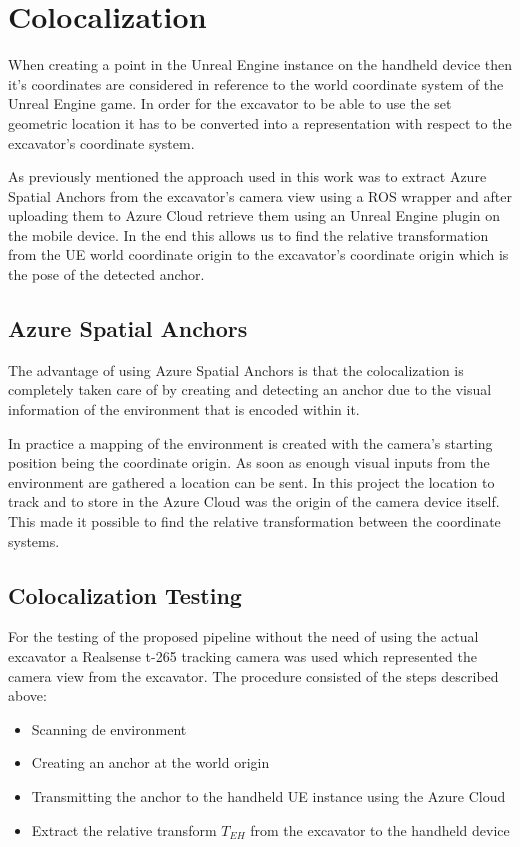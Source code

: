 \chapter*{Colocalization}\label{ch:colocalization}

When creating a point in the Unreal Engine instance on the handheld device then it's coordinates are considered in reference to the world coordinate system of the Unreal Engine game. In order for the excavator to be able to use the set geometric location it has to be converted into a representation with respect to the excavator's coordinate system.

As previously mentioned the approach used in this work was to extract Azure Spatial Anchors from the excavator's camera view using a ROS wrapper and after uploading them to Azure Cloud retrieve them using an Unreal Engine plugin on the mobile device. In the end this allows us to find the relative transformation from the UE world coordinate origin to the excavator's coordinate origin which is the pose of the detected anchor.

\section*{Azure Spatial Anchors}\label{sec:azure_spatial_anchors}

The advantage of using Azure Spatial Anchors is that the colocalization is completely taken care of by creating and detecting an anchor due to the visual information of the environment that is encoded within it.

In practice a mapping of the environment is created with the camera's starting position being the coordinate origin. As soon as enough visual inputs from the environment are gathered a location can be sent. In this project the location to track and to store in the Azure Cloud was the origin of the camera device itself. This made it possible to find the relative transformation between the coordinate systems.

\section*{Colocalization Testing}\label{sec:colocalization_testing}

For the testing of the proposed pipeline without the need of using the actual excavator a Realsense t-265 tracking camera was used which represented the camera view from the excavator. The procedure consisted of the steps described above:
\begin{itemize}
    \item Scanning de environment
    \item Creating an anchor at the world origin
    \item Transmitting the anchor to the handheld UE instance using the Azure Cloud
    \item Extract the relative transform $T_{EH}$ from the excavator to the handheld device
\end{itemize}

